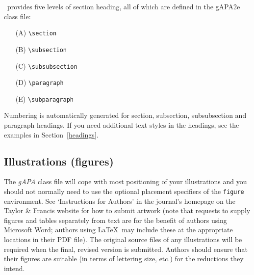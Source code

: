 \documentclass{gAPA2e}
\theoremstyle{plain}
\theoremstyle{remark}
\theoremstyle{definition}
\begin{document}
\LaTeXe\ provides five levels of section heading, all of which are defined in the gAPA2e class file:
\begin{enumerate}
  \item[(A)] \verb"\section"
  \item[(B)] \verb"\subsection"
  \item[(C)] \verb"\subsubsection"
  \item[(D)] \verb"\paragraph"
  \item[(E)] \verb"\subparagraph"
\end{enumerate}
Numbering is automatically generated for section, subsection, subsubsection and paragraph headings. If you need
additional text styles in the headings, see the examples in Section~\ref{headings}.


\subsection{Illustrations (figures)}

The \textit{gAPA} class file will cope with most positioning of your illustrations and you should not normally need to use the optional placement specifiers of the \texttt{figure} environment. See `Instructions for Authors' in the journal's homepage on the Taylor \& Francis website for how to submit artwork (note that requests to supply figures and tables separately from text are for the benefit of authors using Microsoft Word; authors using \LaTeX\ may include these at the appropriate locations in their PDF file). The original source files of any illustrations will be required when the final, revised version is submitted. Authors should ensure that their figures are suitable (in terms of lettering size, etc.) for the reductions they intend.
\end{document}
